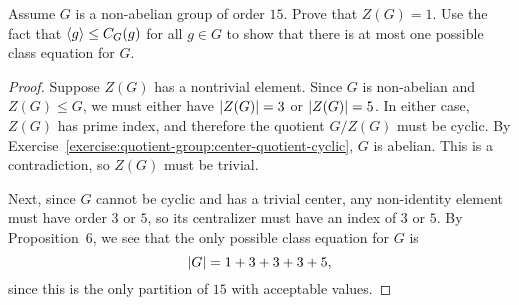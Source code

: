  Assume $G$ is a non-abelian group of order $15$. Prove that
$Z(G) = 1$. Use the fact that $\langle{g}\rangle \leq C_G(g)$ for all $g\in G$
to show that there is at most one possible class equation for $G$.
\begin{proof}
  Suppose $Z(G)$ has a nontrivial element. Since $G$ is non-abelian
  and $Z(G)\leq G$, we must either have $\lvert{Z(G)}\rvert = 3$ or
  $\lvert{Z(G)}\rvert = 5$. In either case, $Z(G)$ has prime index, and
  therefore the quotient $G/Z(G)$ must be cyclic. By
  Exercise~\ref{exercise:quotient-group:center-quotient-cyclic}, $G$
  is abelian. This is a contradiction, so $Z(G)$ must be trivial.

  Next, since $G$ cannot be cyclic and has a trivial center, any
  non-identity element must have order $3$ or $5$, so its centralizer
  must have an index of $3$ or $5$. By Proposition~6, we see that the
  only possible class equation for $G$ is
  \begin{equation*}
    \lvert{G}\rvert = 1 + 3 + 3 + 3 + 5,
  \end{equation*}
  since this is the only partition of $15$ with acceptable values.
\end{proof}

